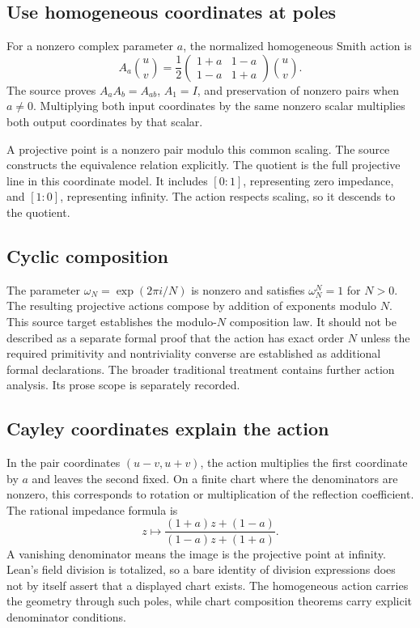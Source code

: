 \subsection{Use homogeneous coordinates at poles}
For a nonzero complex parameter $a$, the normalized homogeneous Smith action is
\[
A_a\binom uv=\frac12
\begin{pmatrix}1+a&1-a\\1-a&1+a\end{pmatrix}\binom uv.
\]
The source proves $A_aA_b=A_{ab}$, $A_1=I$, and preservation of nonzero pairs when $a\ne0$. Multiplying both input coordinates by the same nonzero scalar multiplies both output coordinates by that scalar.

A projective point is a nonzero pair modulo this common scaling. The source constructs the equivalence relation explicitly.
The quotient is the full projective line in this coordinate model. It includes $[0:1]$, representing zero impedance, and $[1:0]$, representing infinity. The action respects scaling, so it descends to the quotient.

\subsection{Cyclic composition}
The parameter $\omega_N=\exp(2\pi i/N)$ is nonzero and satisfies $\omega_N^N=1$ for $N>0$. The resulting projective actions compose by addition of exponents modulo $N$.
This source target establishes the modulo-$N$ composition law. It should not be described as a separate formal proof that the action has exact order $N$ unless the required primitivity and nontriviality converse are established as additional formal declarations. The broader traditional treatment contains further action analysis. Its prose scope is separately recorded.

\subsection{Cayley coordinates explain the action}
In the pair coordinates $(u-v,u+v)$, the action multiplies the first coordinate by $a$ and leaves the second fixed.
On a finite chart where the denominators are nonzero, this corresponds to rotation or multiplication of the reflection coefficient. The rational impedance formula is
\[
z\longmapsto\frac{(1+a)z+(1-a)}{(1-a)z+(1+a)}.
\]
A vanishing denominator means the image is the projective point at infinity. Lean's field division is totalized, so a bare identity of division expressions does not by itself assert that a displayed chart exists. The homogeneous action carries the geometry through such poles, while chart composition theorems carry explicit denominator conditions.

